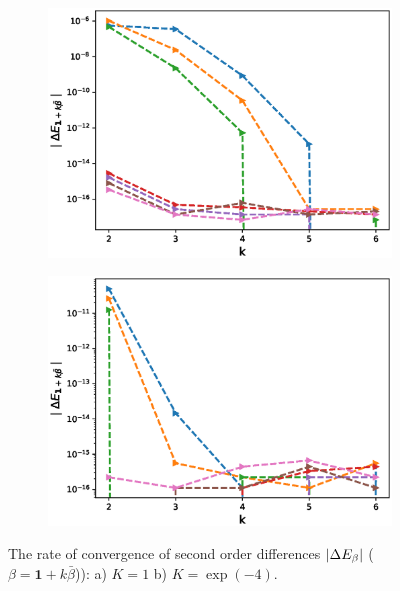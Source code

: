 \documentclass[11pt]{article}
\begin{document}
\begin{figure}[h!]
	\centering
	\begin{subfigure}{.5\textwidth}
		\centering
		\includegraphics[width=1\linewidth]{./figures/mixed_diff_second_way/H_043/N_16/mixed_difference_order2_rbergomi_16steps_H_043_K_1.eps}
		\caption{}
		\label{fig:sub3}
	\end{subfigure}%
	\begin{subfigure}{.5\textwidth}
		\centering
		\includegraphics[width=1\linewidth]{./figures/mixed_diff_second_way/H_043/N_16/mixed_difference_order2_rbergomi_16steps_H_043_K_exp__4.eps}
		\caption{}
		\label{fig:sub4}
	\end{subfigure}
	
	\caption{The rate of convergence of  second order differences $\left\lvert\Delta E_{\beta}\right\rvert$ ($\beta=\mathbf{1}+k \bar{\beta}$)): a) $K=1$ b)  $K=\operatorname{exp}(-4).$}
	\label{fig:test2}
\end{figure}
\end{document}
